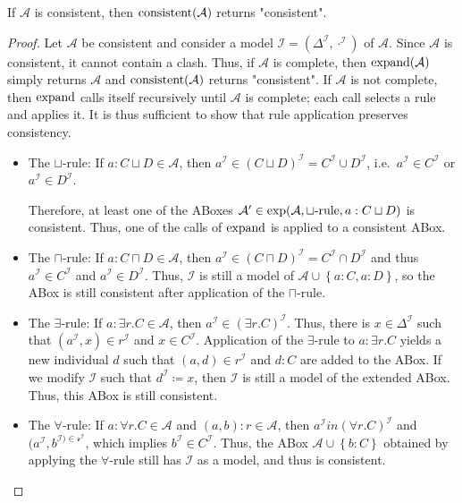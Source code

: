 \begin{lemma}
	If $\mathcal{A}$ is consistent, then $\operatorname{\text{consistent}}(\mathcal{A})$ returns "consistent".
\end{lemma}
\begin{proof}
	Let $\mathcal{A}$ be consistent and consider a model $\mathcal{I} = (\Delta^\mathcal{I}, \cdot^\mathcal{I})$ of $\mathcal{A}$.
	Since $\mathcal{A}$ is consistent, it cannot contain a clash.
	Thus, if $\mathcal{A}$ is complete, then $\operatorname{\text{expand}}(\mathcal{A})$ simply returns $\mathcal{A}$ and $\operatorname{\text{consistent}}(\mathcal{A})$ returns "consistent".
	If $\mathcal{A}$ is not complete, then $\operatorname{\text{expand}}$ calls itself recursively until $\mathcal{A}$ is complete;
	each call selects a rule and applies it.
	It is thus sufficient to show that rule application preserves consistency.
	\begin{itemize}
		\item The $\sqcup$-rule: If $a : C \sqcup D \in \mathcal{A}$, then $a^\mathcal{I} \in (C \sqcup D)^\mathcal{I} = C^\mathcal{I} \cup D^\mathcal{I}$,
			i.e.\ $a^\mathcal{I} \in C^\mathcal{I}$ or $a^\mathcal{I} \in D^\mathcal{I}$.

			Therefore, at least one of the ABoxes $\mathcal{A}' \in \func{exp}(\mathcal{A}, \sqcup \text{-rule}, a:C \sqcup D)$ is consistent.
			Thus, one of the calls of $\operatorname{\text{expand}}$ is applied to a consistent ABox.
		\item The $\sqcap$-rule: If $a : C \sqcap D \in \mathcal{A}$, then $a^\mathcal{I} \in (C \sqcap D)^\mathcal{I} = C^\mathcal{I} \cap D^\mathcal{I}$ 
			and thus $a^\mathcal{I} \in C^\mathcal{I}$ and $a^\mathcal{I} \in D^\mathcal{I}$.
			Thus, $\mathcal{I}$ is still a model of $\mathcal{A} \cup \left\{ a:C, a:D \right\}$, so the ABox is still consistent after application of the $\sqcap$-rule.
		\item The $\exists$-rule: If $a : \exists r.C \in \mathcal{A}$, then $a^\mathcal{I} \in (\exists r.C)^\mathcal{I}$.
			Thus, there is $x \in \Delta^\mathcal{I}$ such that $(a^\mathcal{I}, x) \in r^\mathcal{I}$ and $x \in C^\mathcal{I}$.
			Application of the $\exists$-rule to $a : \exists r.C$ yields a new individual $d$ such that $(a,d) \in r^\mathcal{I}$ and $d : C$ are added to the ABox.
			If we modify  $\mathcal{I}$ such that $d^\mathcal{I} \coloneqq x$, then $\mathcal{I}$ is still a model of the extended ABox.
			Thus, this ABox is still consistent.
		\item The $\forall$-rule: If $a : \forall r.C \in \mathcal{A}$ and $(a,b):r \in \mathcal{A}$, then $a^\mathcal{I} in (\forall r.C)^\mathcal{I}$ and $(a^\mathcal{I}, b^\mathcal{I) \in r^\mathcal{I}}$,
			which implies $b^\mathcal{I} \in C^\mathcal{I}$.
			Thus, the ABox $\mathcal{A} \cup \left\{ b:C \right\}$ obtained by applying the $\forall$-rule still has $\mathcal{I}$ as a model,
			and thus is consistent.
			\qedhere
	\end{itemize}
\end{proof}

